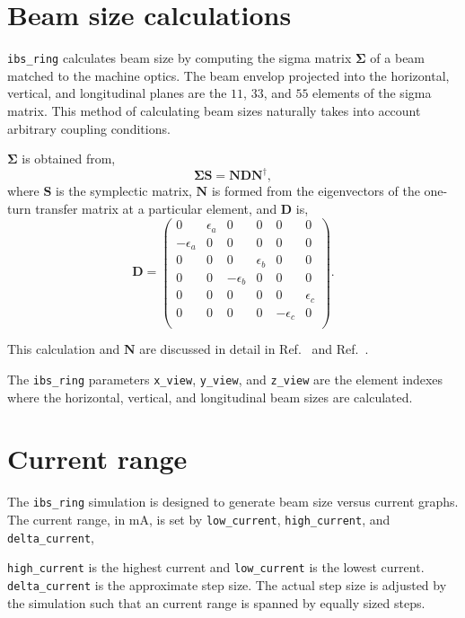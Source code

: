 \documentclass[11pt]{article}
\begin{document}
\section{Beam size calculations}
{\tt ibs_ring} calculates beam size by computing the sigma matrix $\mathbf{\Sigma}$ 
of a beam matched to the machine optics.  
The beam envelop projected into the horizontal, vertical, and longitudinal planes
are the $11$, $33$, and $55$ elements of the sigma matrix.  This method of calculating
beam sizes naturally takes into account arbitrary coupling conditions.

$\mathbf{\Sigma}$ is obtained
from,
\begin{equation}
\mathbf{\Sigma S}=\mathbf{NDN}^\dagger,
\end{equation}
where $\mathbf{S}$ is the symplectic matrix, $\mathbf{N}$ is formed from the
eigenvectors of the one-turn transfer matrix at a particular element,
and $\mathbf{D}$ is,
\begin{equation}
\mathbf{D}=\begin{pmatrix}
0&\epsilon_a&0&0&0&0\\
-\epsilon_a&0&0&0&0&0\\
0&0&0&\epsilon_b&0&0\\
0&0&-\epsilon_b&0&0&0\\
0&0&0&0&0&\epsilon_c\\
0&0&0&0&-\epsilon_c&0\\
\end{pmatrix}.
\end{equation}

This calculation and $\mathbf{N}$ are discussed in detail in Ref.~\cite{b:prst-crab}
and Ref.~\cite{b:wolski-N}.

The {\tt ibs_ring} parameters {\tt x_view}, {\tt y_view}, and {\tt z_view}
are the element indexes
where the horizontal, vertical, and longitudinal beam sizes are calculated.

\section{Current range}
The {\tt ibs_ring} simulation is designed to generate beam size versus current graphs.
The current range, in mA, is set by {\tt low_current}, {\tt high_current}, and {\tt delta_current},

{\tt high_current} is the highest current and {\tt low_current} is the lowest current.
{\tt delta_current} is the approximate step size.  The actual step size is adjusted by the simulation
such that an current range is spanned by equally sized steps.
\end{document}
